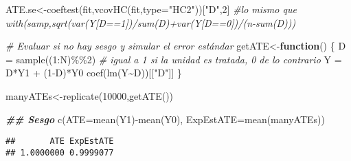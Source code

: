 \documentclass[
]{article}
\newenvironment{Shaded}{\begin{snugshade}}{\end{snugshade}}
\newcommand{\AttributeTok}[1]{\textcolor[rgb]{0.77,0.63,0.00}{#1}}
\newcommand{\CommentTok}[1]{\textcolor[rgb]{0.56,0.35,0.01}{\textit{#1}}}
\newcommand{\ControlFlowTok}[1]{\textcolor[rgb]{0.13,0.29,0.53}{\textbf{#1}}}
\newcommand{\DecValTok}[1]{\textcolor[rgb]{0.00,0.00,0.81}{#1}}
\newcommand{\DocumentationTok}[1]{\textcolor[rgb]{0.56,0.35,0.01}{\textbf{\textit{#1}}}}
\newcommand{\FunctionTok}[1]{\textcolor[rgb]{0.00,0.00,0.00}{#1}}
\newcommand{\NormalTok}[1]{#1}
\newcommand{\OtherTok}[1]{\textcolor[rgb]{0.56,0.35,0.01}{#1}}
\newcommand{\SpecialCharTok}[1]{\textcolor[rgb]{0.00,0.00,0.00}{#1}}
\newcommand{\StringTok}[1]{\textcolor[rgb]{0.31,0.60,0.02}{#1}}
\begin{document}
\begin{Shaded}
\begin{Highlighting}[]
\NormalTok{ATE.se}\OtherTok{\textless{}{-}}\FunctionTok{coeftest}\NormalTok{(fit,}\FunctionTok{vcovHC}\NormalTok{(fit,}\AttributeTok{type=}\StringTok{"HC2"}\NormalTok{))[}\StringTok{"D"}\NormalTok{,}\DecValTok{2}\NormalTok{] }
 \CommentTok{\#lo mismo que with(samp,sqrt(var(Y[D==1])/sum(D)+var(Y[D==0])/(n{-}sum(D))) }

\CommentTok{\# Evaluar si no hay sesgo y simular el error estándar}
\NormalTok{getATE}\OtherTok{\textless{}{-}}\ControlFlowTok{function}\NormalTok{() \{}
\NormalTok{  D }\OtherTok{=} \FunctionTok{sample}\NormalTok{((}\DecValTok{1}\SpecialCharTok{:}\NormalTok{N)}\SpecialCharTok{\%\%}\DecValTok{2}\NormalTok{) }\CommentTok{\#  igual a 1 si la unidad es tratada, 0 de lo contrario}
\NormalTok{  Y }\OtherTok{=}\NormalTok{ D}\SpecialCharTok{*}\NormalTok{Y1 }\SpecialCharTok{+}\NormalTok{ (}\DecValTok{1}\SpecialCharTok{{-}}\NormalTok{D)}\SpecialCharTok{*}\NormalTok{Y0 }
  \FunctionTok{coef}\NormalTok{(}\FunctionTok{lm}\NormalTok{(Y}\SpecialCharTok{\textasciitilde{}}\NormalTok{D))[[}\StringTok{"D"}\NormalTok{]] }
\NormalTok{\} }

\NormalTok{manyATEs}\OtherTok{\textless{}{-}}\FunctionTok{replicate}\NormalTok{(}\DecValTok{10000}\NormalTok{,}\FunctionTok{getATE}\NormalTok{()) }

\DocumentationTok{\#\# Sesgo}
\FunctionTok{c}\NormalTok{(}\AttributeTok{ATE=}\FunctionTok{mean}\NormalTok{(Y1)}\SpecialCharTok{{-}}\FunctionTok{mean}\NormalTok{(Y0), }\AttributeTok{ExpEstATE=}\FunctionTok{mean}\NormalTok{(manyATEs)) }
\end{Highlighting}
\end{Shaded}

\begin{verbatim}
##       ATE ExpEstATE 
## 1.0000000 0.9999077
\end{verbatim}
\end{document}
